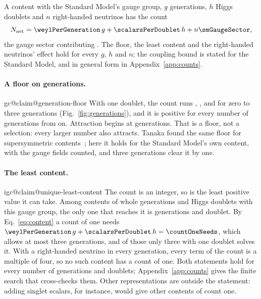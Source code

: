 \documentclass[aps,prd,reprint,amsmath,amssymb,superscriptaddress,nofootinbib]{revtex4-2}
\makeatletter
\newcommand{\Nnet}{N_{\mathrm{net}}}
\newcommand{\claim}[1]{\expandafter\xdef\csname igc@claim@#1\endcsname{\thesection}}
\makeatother
\begin{document}
A content with the Standard Model's gauge group, $g$ generations, $h$ Higgs doublets
and $n$ right-handed neutrinos has the count
\begin{equation}
\Nnet=\weylPerGeneration\,g+\scalarsPerDoublet\,h+n\smGaugeSector ,
\label{eq:content}
\end{equation}
the gauge sector contributing \smGaugeSector{}. The floor, the least content and the
right-handed neutrinos' effect hold for every $g$, $h$ and $n$; the coupling bound is
stated for the Standard Model, and in general form in Appendix~\ref{app:counts}.

\paragraph{A floor on generations.}
\claim{generation-floor}%
With one doublet, the count runs \genCountZero, \genCountOne, \genCountTwo{} and
\genCountThree{} for zero to three generations (Fig.~\ref{fig:generations}), and it is
positive for every number of generations from
\floorGenerationsSpelled{} on. Attraction begins at \floorGenerationsSpelled{}
generations. That is a floor, not a selection: every larger number also attracts.
Tanaka found the same floor for supersymmetric contents~\cite{Tanaka1996}; here it
holds for the Standard Model's own content, with the gauge fields counted, and three
generations clear it by one.

\paragraph{The least content.}
\claim{unique-least-content}%
The count is an integer, so \smNet{} is the least positive value it can take. Among
contents of whole generations and Higgs doublets with this gauge group, the only one
that reaches it is \countOneGenerationsSpelled{} generations and
\countOneDoubletsSpelled{} doublet. By Eq.~\eqref{eq:content} a count of one
needs $\weylPerGeneration\,g+\scalarsPerDoublet\,h=\countOneNeeds$, which allows at
most three generations, and of those only three with one doublet solves it. With a
right-handed neutrino in every generation, every term of the count is a multiple of
four, so no such content has a count of one. Both statements hold for every number of
generations and doublets; Appendix~\ref{app:counts} gives the finite search that
cross-checks them. Other representations are outside the statement: adding singlet
scalars, for instance, would give other contents of count one.
\end{document}
